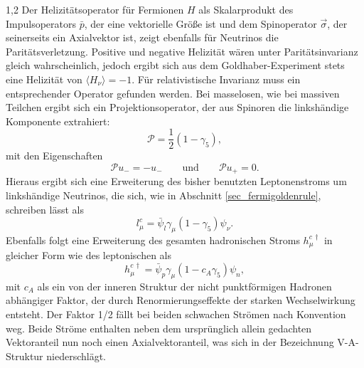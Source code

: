 \documentclass[11pt,a4paper,twoside,draft]{report}
\begin{document}
\begin{spacing}{1,2}
\noindent
Der Helizitätsoperator für Fermionen $H$ als Skalarprodukt des Impulsoperators $\bar p$, der eine vektorielle Größe ist und dem Spinoperator $\vec \sigma$, 
der seinerseits ein Axialvektor ist, zeigt ebenfalls für Neutrinos die Paritätsverletzung. Positive und negative Helizität wären unter
Paritätsinvarianz gleich wahrscheinlich, jedoch ergibt sich aus dem Goldhaber-Experiment stets eine Helizität von $\langle H_\nu \rangle= -1$. Für relativistische
Invarianz muss ein entsprechender Operator gefunden werden. Bei masselosen, wie bei massiven Teilchen ergibt sich ein Projektionsoperator, der aus Spinoren 
die linkshändige Komponente extrahiert:
\begin{equation}
 \mathcal{P} = \frac12(1-\gamma_5),
\end{equation}
mit den Eigenschaften
\begin{equation}
 \mathcal{P}u_- = -u_- \qquad \text{und}\qquad \mathcal{P}u_+ = 0.
\end{equation}
Hieraus ergibt sich eine Erweiterung des bisher benutzten Leptonenstroms um linkshändige Neutrinos, die sich, wie in Abschnitt \ref{sec_fermigoldenrule}, schreiben lässt als
\begin{equation}
 l_\mu^c = \bar \psi_l \gamma_\mu (1-\gamma_5) \psi_\nu.
\end{equation}
Ebenfalls folgt eine Erweiterung des gesamten hadronischen Stroms $h_\mu^{c\,\dagger}$ in gleicher Form wie des leptonischen als
\begin{equation}
 h_\mu^{c\,\dagger} = \bar \psi_p \gamma_\mu(1-c_A\gamma_5)\psi_n,
\end{equation}
mit $c_A$ als ein von der inneren Struktur der nicht punktförmigen Hadronen abhängiger Faktor, der durch Renormierungseffekte der starken Wechselwirkung entsteht.
Der Faktor 1/2 fällt bei beiden schwachen Strömen nach Konvention weg. 
Beide Ströme enthalten neben dem ursprünglich allein gedachten Vektoranteil nun noch einen Axialvektoranteil, was sich in der Bezeichnung V-A-Struktur
niederschlägt.


\end{spacing}
\end{document}
